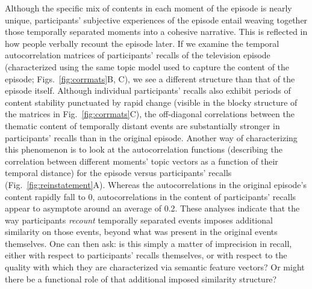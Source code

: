 \documentclass{article}
\begin{document}
Although the specific mix of contents in each moment of the episode is nearly unique, participants' subjective experiences of the episode entail weaving together those temporally separated moments into a cohesive narrative.  This is reflected in how people verbally recount the episode later.  If we examine the temporal autocorrelation matrices of participants' recalls of the television episode (characterized using the same topic model used to capture the content of the episode; Figs.~\ref{fig:corrmats}B, C), we see a different structure than that of the episode itself.  Although individual participants' recalls also exhibit periods of content stability punctuated by rapid change (visible in the blocky structure of the matrices in Fig.~\ref{fig:corrmats}C), the off-diagonal correlations between the thematic content of temporally distant events are substantially stronger in participants' recalls than in the original episode.  Another way of characterizing this phenomenon is to look at the autocorrelation functions (describing the correlation between different moments' topic vectors as a function of their temporal distance) for the episode versus participants' recalls (Fig.~\ref{fig:reinstatement}A).  Whereas the autocorrelations in the original episode's content rapidly fall to 0, autocorrelations in the content of participants' recalls appear to asymptote around an average of 0.2.  These analyses indicate that the way participants \textit{recount} temporally separated events imposes additional similarity on those events, beyond what was present in the original events themselves.  One can then ask: is this simply a matter of imprecision in recall, either with respect to participants' recalls themselves, or with respect to the quality with which they are characterized via semantic feature vectors?  Or might there be a functional role of that additional imposed similarity structure?
\end{document}
